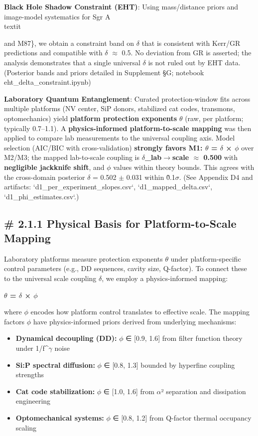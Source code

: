 \documentclass[aps,prd,preprint,onecolumn,nofootinbib,superscriptaddress,longbibliography]{revtex4-2}
\begin{document}
\textbf{Black Hole Shadow Constraint (EHT)}:
Using mass/distance priors and image-model systematics for Sgr A\\textit{ and M87\}, we obtain a constraint band on $\delta$ that is consistent with Kerr/GR predictions and compatible with $\delta$ $\approx$ 0.5. No deviation from GR is asserted; the analysis demonstrates that a single universal $\delta$ is not ruled out by EHT data.
(Posterior bands and priors detailed in Supplement §G; notebook eht\_delta\_constraint.ipynb)

\textbf{Laboratory Quantum Entanglement}:
Curated protection-window fits across multiple platforms (NV center, Si\:P donors, stabilized cat codes, transmons, optomechanics) yield \textbf{platform protection exponents} $\theta$ (raw, per platform; typically 0.7--1.1). A \textbf{physics-informed platform-to-scale mapping} was then applied to compare lab measurements to the universal coupling axis. Model selection (AIC/BIC with cross-validation) \textbf{strongly favors M1: $\theta$ = $\delta$ × $\phi$} over M2/M3; the mapped lab-to-scale coupling is \textbf{$\delta$_lab$\rightarrow$scale $\approx$ 0.500} with \textbf{negligible jackknife shift}, and $\phi$ values within theory bounds. This agrees with the cross-domain posterior $\delta$ = 0.502 $\pm$ 0.031 within \~0.1$\sigma$. (See Appendix D4 and artifacts: `d1_per_experiment_slopes.csv`, `d1_mapped_delta.csv`, `d1_phi_estimates.csv`.)

\subsection{# 2.1.1 Physical Basis for Platform-to-Scale Mapping}

Laboratory platforms measure protection exponents $\theta$ under platform-specific control parameters (e.g., DD sequences, cavity size, Q-factor). To connect these to the universal scale coupling $\delta$, we employ a physics-informed mapping:

\textbf{$\theta$ = $\delta$ × $\phi$}

where $\phi$ encodes how platform control translates to effective scale. The mapping factors $\phi$ have physics-informed priors derived from underlying mechanisms:

\begin{itemize}
\item \textbf{Dynamical decoupling (DD):} $\phi$ ∈ [0.9, 1.6] from filter function theory under 1/f^$\gamma$ noise
\item \textbf{Si:P spectral diffusion:} $\phi$ ∈ [0.8, 1.3] bounded by hyperfine coupling strengths
\item \textbf{Cat code stabilization:} $\phi$ ∈ [1.0, 1.6] from $\alpha$² separation and dissipation engineering
\item \textbf{Optomechanical systems:} $\phi$ ∈ [0.8, 1.2] from Q-factor thermal occupancy scaling
\end{itemize}

}
\end{document}
